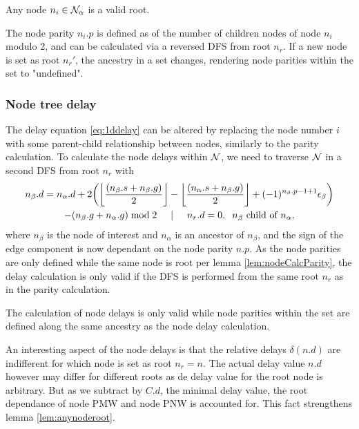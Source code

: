 \begin{lemma}\label{lem:anynoderoot}
  Any node $n_i \in \mathcal{N}_\alpha$ is a valid root.
\end{lemma}

\begin{lemma}\label{lem:nodeCalcParity}
  The node parity $n_i.p$ is defined as of the number of children nodes of node $n_i$ modulo 2, and can be calculated via a reversed DFS from root $n_r$. If a new node is set as root $n_r'$, the ancestry in a set changes, rendering node parities within the set to "undefined".
\end{lemma}

\subsubsection{Node tree delay}

The delay equation \ref{eq:1ddelay} can be altered by replacing the node number $i$ with some parent-child relationship between nodes, similarly to the parity calculation. To calculate the node delays within $\mathcal{N}$, we need to traverse $\mathcal{N}$ in a second DFS from root $n_r$ with
\begin{multline}\label{eq:2ddelay}
  n_\beta.d = n_\alpha.d + 2\bigg({\left \lfloor \frac{(n_\beta.s+n_\beta.g)}{2} \right \rfloor } - {\left \lfloor \frac{(n_\alpha.s+n_\beta.g)}{2} \right \rfloor } + (-1)^{n_\beta.p-1+1}\epsilon_\beta\bigg) \\
         - (n_\beta.g + n_\alpha.g)\bmod 2 \hspace{.5cm} | \hspace{.5cm} n_r.d = 0, \hspace{.2cm} n_\beta \mbox{ child of } n_\alpha,
\end{multline}
where $n_\beta$ is the node of interest and $n_\alpha$ is an ancestor of $n_\beta$, and the sign of the edge component is now dependant on the node parity $n.p$. As the node parities are only defined while the same node is root per lemma \ref{lem:nodeCalcParity}, the delay calculation is only valid if the DFS is performed from the same root $n_r$ as in the parity calculation.

\begin{lemma}\label{lem:nodecalc_ancestrypath}
 The calculation of node delays is only valid while node parities within the set are defined along the same ancestry as the node delay calculation.
\end{lemma}

An interesting aspect of the node delays is that the relative delays $\delta(n.d)$ are indifferent for which node is set as root $n_r = n$. The actual delay value $n.d$ however may differ for different roots as de delay value for the root node is arbitrary. But as we subtract by $C.d$, the minimal delay value, the root dependance of node PMW and node PNW is accounted for. This fact strengthens lemma \ref{lem:anynoderoot}.

